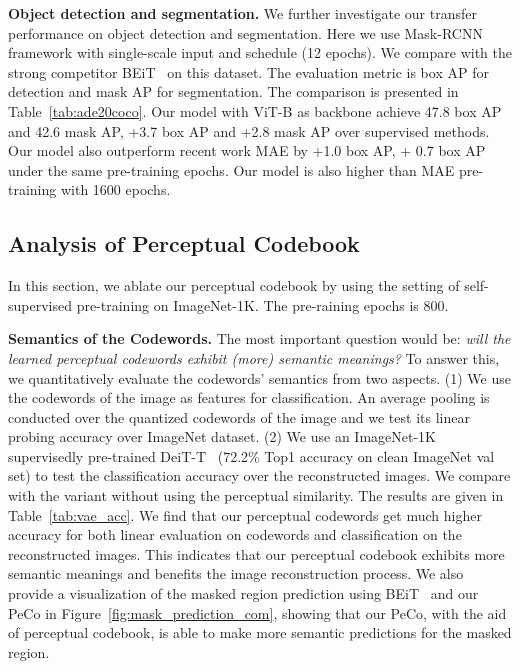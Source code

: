 \documentclass[letterpaper]{article} \usepackage{aaai23}  \usepackage{times}  \usepackage{helvet}  \usepackage{courier}  \usepackage[hyphens]{url}  \usepackage{graphicx} \urlstyle{rm} \def\UrlFont{\rm}  \usepackage{natbib}  \usepackage{caption} \frenchspacing  \setlength{\pdfpagewidth}{8.5in}  \setlength{\pdfpageheight}{11in}  \usepackage{algorithm}
\begin{document}
\noindent \textbf{Object detection and segmentation.}
We further investigate our transfer performance on object detection and segmentation. Here we use Mask-RCNN~\cite{he2017mask} framework with single-scale input and  schedule (12 epochs).
We compare with the strong competitor BEiT~\cite{bao2021beit} on this dataset.
The evaluation metric is box AP for detection and mask AP for segmentation.
The comparison is presented in Table~\ref{tab:ade20coco}. Our model with ViT-B as backbone achieve 47.8 box AP and 42.6 mask AP, +3.7 box AP and +2.8 mask AP over supervised methods. Our model also outperform recent work MAE by +1.0 box AP, + 0.7 box AP under the same pre-training epochs. Our model is also higher than MAE pre-training with 1600 epochs. 



\subsection{Analysis of Perceptual Codebook}
In this section, we ablate our perceptual codebook by using the setting of self-supervised pre-training on ImageNet-1K. 
The pre-raining epochs is 800.


\noindent \textbf{Semantics of the Codewords.}
The most important question would be:
\emph{will the learned perceptual codewords exhibit (more) semantic meanings?}
To answer this, 
we quantitatively evaluate the codewords' semantics from two aspects.
(1) We use the codewords of the image as features for classification. An average pooling is conducted over the quantized codewords of the image and we test its linear probing accuracy over ImageNet dataset.
(2) We use an ImageNet-1K supervisedly pre-trained DeiT-T~\cite{touvron2021training} (72.2\% Top1 accuracy on clean ImageNet val set) to test the classification accuracy over the reconstructed images.
We compare with the variant without using the perceptual similarity.
The results are given in Table~\ref{tab:vae_acc}.
We find that our perceptual codewords get much higher accuracy for both linear evaluation on codewords and classification on the reconstructed images. 
This indicates that our perceptual codebook exhibits more semantic meanings and benefits the image reconstruction process. 
We also provide a visualization of the masked region prediction using BEiT~\cite{bao2021beit} and our PeCo in Figure~\ref{fig:mask_prediction_com}, showing that our PeCo, with the aid of perceptual codebook, is able to make more semantic predictions for the masked region.
\end{document}
